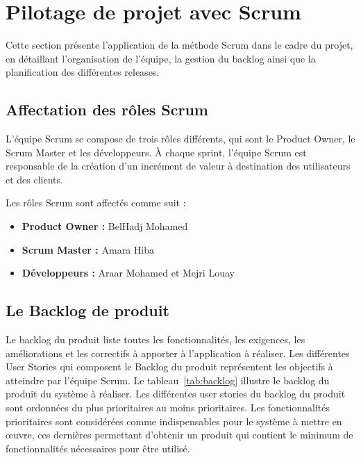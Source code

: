 \section{Pilotage de projet avec Scrum}

Cette section présente l'application de la méthode Scrum dans le cadre du projet, en
détaillant l'organisation de l'équipe, la gestion du backlog ainsi que la planification
des différentes releases.

\subsection{Affectation des rôles Scrum}

L'équipe Scrum se compose de trois rôles différents, qui sont le Product Owner, le Scrum
Master et les développeurs. À chaque sprint, l'équipe Scrum est responsable de la création
d'un incrément de valeur à destination des utilisateurs et des clients.

Les rôles Scrum sont affectés comme suit :

\begin{itemize}
  \item \textbf{Product Owner :} BelHadj Mohamed
  \item \textbf{Scrum Master :} Amara Hiba
  \item \textbf{Développeurs :} Araar Mohamed et Mejri Louay
\end{itemize}

\subsection{Le Backlog de produit}

Le backlog du produit liste toutes les fonctionnalités, les exigences, les améliorations et
les correctifs à apporter à l'application à réaliser. Les différentes User Stories qui
composent le Backlog du produit représentent les objectifs à atteindre par l'équipe Scrum.
Le tableau~\ref{tab:backlog} illustre le backlog du produit du système à réaliser. Les
différentes user stories du backlog du produit sont ordonnées du plus prioritaires au moins
prioritaires. Les fonctionnalités prioritaires sont considérées comme indispensables pour le
système à mettre en œuvre, ces dernières permettant d'obtenir un produit qui contient le
minimum de fonctionnalités nécessaires pour être utilisé.

